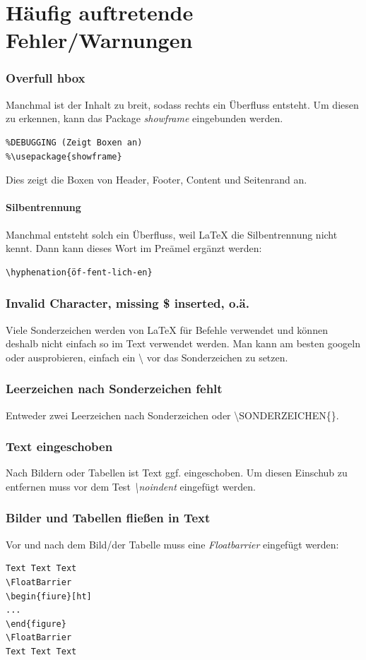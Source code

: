 \documentclass[12pt]{article}
\begin{document}
\part{Häufig auftretende Fehler/Warnungen}
\section{Overfull hbox}
Manchmal ist der Inhalt zu breit, sodass rechts ein Überfluss entsteht. Um diesen zu erkennen, kann das Package \textit{showframe}  eingebunden werden.
\begin{verbatim}
%DEBUGGING (Zeigt Boxen an)
%\usepackage{showframe}
\end{verbatim}
Dies zeigt die Boxen von Header, Footer, Content und Seitenrand an.
\subsection{Silbentrennung}
Manchmal entsteht solch ein Überfluss, weil LaTeX die Silbentrennung nicht kennt. Dann kann dieses Wort im Preämel ergänzt werden:
\begin{verbatim}
\hyphenation{öf-fent-lich-en}
\end{verbatim}

\section{Invalid Character, missing \$ inserted, o.ä.}
Viele Sonderzeichen werden von LaTeX für Befehle verwendet und können deshalb nicht einfach so im Text verwendet werden. Man kann am besten googeln oder ausprobieren, einfach ein \textbackslash{} vor das Sonderzeichen zu setzen.

\section{Leerzeichen nach Sonderzeichen fehlt}
Entweder zwei Leerzeichen nach Sonderzeichen oder \textbackslash SONDERZEICHEN\{\}.

\section{Text eingeschoben}
Nach Bildern oder Tabellen ist Text ggf. eingeschoben. Um diesen Einschub zu entfernen muss vor dem Test \textit{\textbackslash noindent} eingefügt werden.

\section{Bilder und Tabellen fließen in Text}
Vor und nach dem Bild/der Tabelle muss eine \textit{Floatbarrier} eingefügt werden:
\begin{verbatim}
Text Text Text
\FloatBarrier
\begin{fiure}[ht]
...
\end{figure}
\FloatBarrier
Text Text Text
\end{verbatim}
\end{document}
